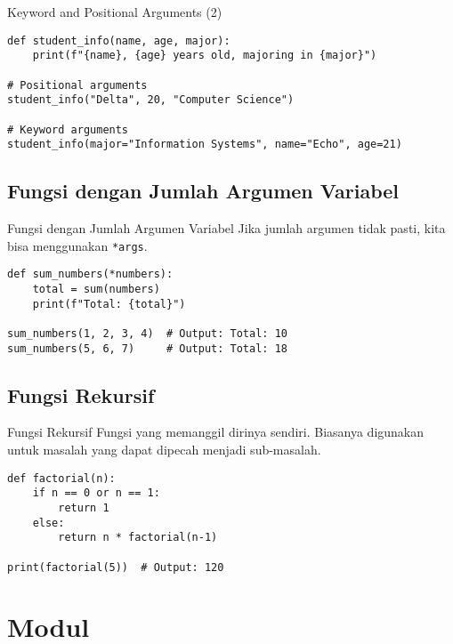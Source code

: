 \documentclass[aspectratio=169, table]{beamer}
\begin{document}
\begin{frame}[fragile]{Keyword and Positional Arguments (2)}
\begin{lstlisting}[style=PythonStyle, caption={Kode Python: function_with_keyword_and_positional.py}]
def student_info(name, age, major):
    print(f"{name}, {age} years old, majoring in {major}")

# Positional arguments
student_info("Delta", 20, "Computer Science")

# Keyword arguments
student_info(major="Information Systems", name="Echo", age=21)
\end{lstlisting}
\end{frame}

\subsection{Fungsi dengan Jumlah Argumen Variabel}

\begin{frame}[fragile]{Fungsi dengan Jumlah Argumen Variabel}
Jika jumlah argumen tidak pasti, kita bisa menggunakan \texttt{*args}.
\begin{lstlisting}[style=PythonStyle, caption={Kode Python: function_with_variable_arguments.py}]
def sum_numbers(*numbers):
    total = sum(numbers)
    print(f"Total: {total}")

sum_numbers(1, 2, 3, 4)  # Output: Total: 10
sum_numbers(5, 6, 7)     # Output: Total: 18
\end{lstlisting}
\end{frame}

\subsection{Fungsi Rekursif}
\begin{frame}[fragile]{Fungsi Rekursif}
Fungsi yang memanggil dirinya sendiri. Biasanya digunakan untuk masalah yang dapat dipecah menjadi sub-masalah.

\begin{lstlisting}[style=PythonStyle, caption={Kode Python: recursive_function.py}]
def factorial(n):
    if n == 0 or n == 1:
        return 1
    else:
        return n * factorial(n-1)

print(factorial(5))  # Output: 120
\end{lstlisting}
\end{frame}

\section{Modul}
\end{document}
